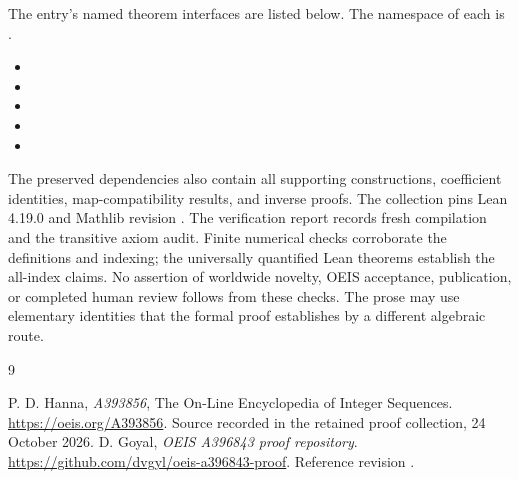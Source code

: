 \documentclass[11pt,a4paper]{article}
\theoremstyle{remark}\newtheorem{remark}[theorem]{Remark}
\begin{document}
The entry's named theorem interfaces are listed below. The namespace of
each is .
\begin{itemize}[leftmargin=1.5em,itemsep=1pt]
\item {}
\item {}
\item {}
\item {}
\item {}
\end{itemize}
The preserved dependencies also contain all supporting constructions,
coefficient identities, map-compatibility results, and inverse proofs.
The collection pins Lean 4.19.0 and Mathlib revision
.
The verification report records fresh compilation and the transitive axiom
audit. Finite numerical checks corroborate the definitions and indexing;
the universally quantified Lean theorems establish the all-index claims.
No assertion of worldwide novelty, OEIS acceptance, publication, or completed
human review follows from these checks. The prose may use elementary
identities that the formal proof establishes by a different algebraic route.

\begin{thebibliography}{9}\raggedright
{} P. D. Hanna, \emph{A393856}, The On-Line Encyclopedia of Integer
Sequences. \url{https://oeis.org/A393856}. Source recorded in the retained
proof collection, 24 October 2026.
 D. Goyal, \emph{OEIS A396843 proof repository}.
\url{https://github.com/dvgyl/oeis-a396843-proof}.
Reference revision .
\end{thebibliography}
\end{document}

